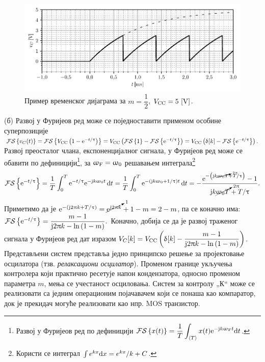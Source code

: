 \begin{figure}[ht!]
    \centering
    \includegraphics[scale=1]{fig/exp_osc_plot.pdf}
    \caption{Пример временског дијаграма за $m = \dfrac{1}{2}$, $V_{\rm CC} = 5\,\left[\mathrm{V}\right]$. }
    \label{fig:\ID.2}
\end{figure} 

(б) Развој у Фуријеов ред може се поједноставити применом особине суперпозиције
$\mathcal{FS}\left\{ v_C(t) \right\} = 
\mathcal{FS}\left\{ V_{\rm CC} \left(
    1 - {\rm e}^{-t/\uptau} \right) \right\} 
= V_{\rm CC} \left(
    \mathcal{FS}\left\{1\right\}
    -
    \mathcal{FS}\left\{
    {\rm e}^{-t/\uptau}    
    \right\}
\right) 
= V_{\rm CC} \left(
\updelta[k] 
-
\mathcal{FS}\left\{
    {\rm e}^{-t/\uptau}    
    \right\}
\right).
$ 
Развој преосталог члана, експоненцијалног сигнала, у Фуријеов ред може се обавити по 
дефиницији\footnote{
    Развој у Фуријеов ред по дефиницији 
    $\displaystyle\mathcal{FS}\left\{x(t)\right\} = \dfrac{1}{T}\int_{\langle T \rangle} x(t) {\rm e}^{-{\rm j} k \upomega_{\rm F} t} {\rm d} t$.
}, за $\upomega_{\rm F} = \upomega_0$
решавањем интеграла\footnote{Користи се интеграл 
    $\int e^{kx} {\rm d} x = e^{kx}/k + C$.
} 
\begin{equation}
    \mathcal{FS}\left\{
    {\rm e}^{-t/\uptau}    
    \right\}
    = \dfrac{1}{T}\int_0^T 
    {\rm e}^{-t/\uptau} {\rm e}^{-{\rm j} k \upomega_0 t} \,{\rm d} t
    =
    \dfrac{1}{T}\int_0^T 
    {\rm e}^{-\left( {\rm j} k\upomega_0  +  1/\uptau \right) t } \,{\rm d} t
    = 
    -\dfrac{
        {\rm e}^{-\left( {\rm j} k \cancelto{2\uppi}{\upomega_0 T}  +  T/\uptau \right) }
        - 1
    }{ {\rm j} k \cancelto{ 2\uppi }{\upomega_0 T}  +  T/\uptau }.
\end{equation}
Приметимо да је 
$
{\rm e}^{ -\left( {\rm j} 2\uppi k  +  T/\uptau \right)} 
= \cancelto{1}{{\rm e}^{{\rm j} 2\uppi k}} + {1-m} = 2 - m$, па се коначно има: 
$
\mathcal{FS}\left\{
    {\rm e}^{-t/\uptau}    
    \right\} =
    \dfrac{m - 1}{
        {\rm j} 2\uppi k - \ln\left( 1 - m \right)
    }.
$ Коначно, добија се да је развој траженог сигнала у Фуријеов ред дат изразом
$V_C[k] = 
V_{\rm CC} \left(
    \updelta[k] 
        - 
        \dfrac{m - 1}{
            {\rm j} 2\uppi k - \ln\left( 1 - m \right)
        }
\right)$. \\

Представљени систем представља једно принципско решење за пројектовање осцилатора 
(тзв. \textit{релаксациони осцилатор}). Променом границе укључења контролера који практично
ресетује напон кондензатора, односно променом 
параметра $m$,
мења се учестаност осциловања. Систем за контролу „К“ може се реализовати са једним операционим
појачавачем који се понаша као компаратор, док је прекидач могуће реализовати као нпр. MOS 
транзистор. 

